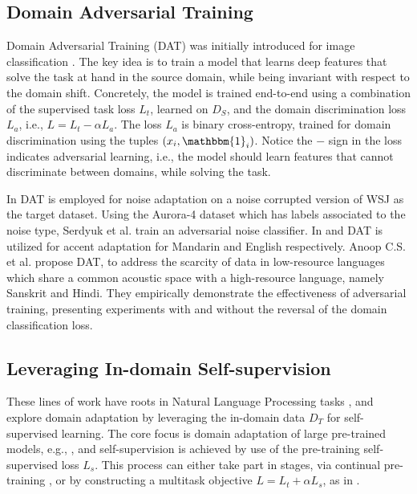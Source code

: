\documentclass[journal]{IEEEtran}
\begin{document}
\subsection{Domain Adversarial Training}
\label{sec:dat}

Domain Adversarial Training (DAT) was initially introduced for image classification \cite{imageadverserial}. The key idea is to train a model that learns deep features that solve the task at hand in the source domain, while being invariant with respect to the domain shift. Concretely, the model is trained end-to-end using a combination of the supervised task loss $L_t$, learned on $D_S$, and the domain discrimination loss $L_{a}$, i.e., $L = L_t - \alpha L_{a}$. The loss $L_a$ is binary cross-entropy, trained for domain discrimination using the tuples $(x_i, \mathbbm{1}_i)$. Notice the $-$ sign in the loss indicates adversarial learning, i.e., the model should learn features that cannot discriminate between domains, while solving the task.

In \cite{adverserialASR1} DAT is employed for noise adaptation on a noise corrupted version of WSJ \cite{paul1992design} as the target dataset. Using the Aurora-4 \cite{yeung2004improved}  dataset which has labels associated to the noise type, Serdyuk et al. \cite{adverserialASR2} train an adversarial noise classifier.  In \cite{adverserialASRaccent} and \cite{adversarialASRAccentREDAT} DAT is utilized for accent adaptation for Mandarin and English respectively.
Anoop C.S. et al. \cite{adverserialASRlow}  propose DAT, to address the
scarcity of data in low-resource languages which share a
common acoustic space with a high-resource language, namely Sanskrit and Hindi. They empirically demonstrate the effectiveness of adversarial training, presenting experiments with and without the reversal of the domain classification loss.





\subsection{Leveraging In-domain Self-supervision}
\label{sec:self-sup-background}
These lines of work have roots in Natural Language Processing tasks \cite{karouzos-etal-2021-udalm,gururangan-etal-2020-dont}, and explore domain adaptation by leveraging the in-domain data $D_T$ for self-supervised learning. The core focus is domain adaptation of large pre-trained models, e.g., \cite{bert}, and self-supervision is achieved by use of the pre-training self-supervised loss $L_s$. This process can either take part in stages, via continual pre-training \cite{gururangan-etal-2020-dont}, or by constructing a multitask objective $L = L_t + \alpha L_s$, as in \cite{karouzos-etal-2021-udalm}.
\end{document}
